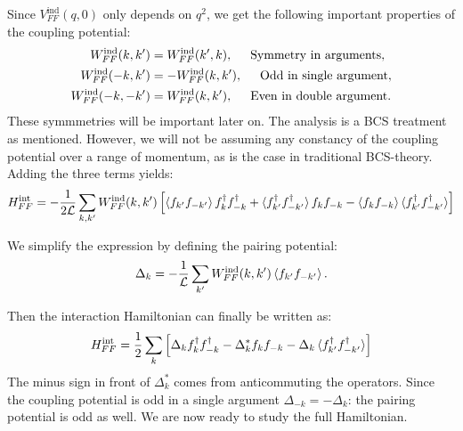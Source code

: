 Since $V^\text{ind}_{FF}(q,0)$ only depends on $q^2$, we get the following important properties of the coupling potential: 
\begin{align}
W^\text{ind}_{FF}(k,k') &= W^\text{ind}_{FF}(k',k), \hspace{0.5cm} \text{Symmetry in arguments}, \nonumber \\
W^\text{ind}_{FF}(-k,k') &= -W^\text{ind}_{FF}(k,k'), \hspace{0.5cm} \text{Odd in single argument}, \nonumber \\
W^\text{ind}_{FF}(-k,-k') &= W^\text{ind}_{FF}(k,k'), \hspace{0.5cm} \text{Even in double argument}.
\label{eq.CouplingPotentialSymmetries}
\end{align}
These symmmetries will be important later on. The analysis is a BCS treatment as mentioned. However, we will not be assuming any constancy of the coupling potential over a range of momentum, as is the case in traditional BCS-theory\cite{Tinkham,LandauStatPhys2,PlischkeStatPhys}. Adding the three terms yields:
\begin{equation}
H^\text{int}_{FF} = -\frac{1}{2\mathcal{L}}\sum_{k,k'} W^\text{ind}_{FF}(k,k')\left[ \braket{ f_{k'}f_{-k'}} f^\dagger_k f^\dagger_{-k} + \braket {f^\dagger_{k'}f^\dagger_{-k'}} f_k f_{-k} - \braket {f_{k}f_{-k}} \braket {f^\dagger_{k'}f^\dagger_{-k'}} \right] \nonumber
\end{equation}

We simplify the expression by defining the pairing potential:
\begin{equation}
\Delta_k = -\frac{1}{\mathcal{L}}\sum_{k'}W^\text{ind}_{FF}(k,k')\braket {f_{k'}f_{-k'}}.
\label{eq.pairingpotentialdef}
\end{equation}

Then the interaction Hamiltonian can finally be written as:
\begin{equation}
H^\text{int}_{FF} = \frac{1}{2}\sum_{k} \left[ \Delta_k f^\dagger_k f^\dagger_{-k} - \Delta^*_k f_k f_{-k} - \Delta_k \braket {f^\dagger_{k'}f^\dagger_{-k'}} \right]
\label{eq.HFFintfinal}
\end{equation}
The minus sign in front of $\Delta^*_k$ comes from anticommuting the operators. Since the coupling potential is odd in a single argument $\Delta_{-k} = -\Delta_k$: the pairing potential is odd as well. We are now ready to study the full Hamiltonian.

